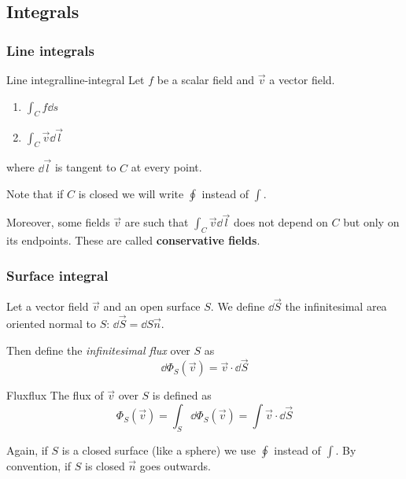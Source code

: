 \documentclass[12pt]{extarticle}
\begin{document}
\subsection{Integrals}

\subsubsection{Line integrals}

\begin{definition}{Line integral}{line-integral}
	Let $f$ be a scalar field and $\vec v$ a vector field.
	\begin{enumerate}
		\item $\int_C f \dd{s}$
		\item $\int_C \vec v \dd{\vec l}$
	\end{enumerate}
	where $\dd{\vec l}$ is tangent to $C$ at every point.
\end{definition}

Note that if $C$ is closed we will write $\oint$ instead of $\int$.

Moreover, some fields $\vec v$ are such that $\int_C \vec v \dd{\vec l}$ does not depend on $C$ but only on its endpoints.
These are called \textbf{conservative fields}.

\subsubsection{Surface integral}

Let a vector field $\vec v$ and an open surface $S$.
We define $\dd{\vec S}$ the infinitesimal area oriented normal to $S$: $\dd{\vec S} = \dd{S} \vec n$.

Then define the \textit{infinitesimal flux} over $S$ as
\begin{equation}
	\dd{\Phi_S(\vec v)} = \vec v \cdot \dd{\vec S}
\end{equation}

\begin{definition}{Flux}{flux}
	The flux of $\vec v$ over $S$ is defined as
	\begin{equation}
		\Phi_S(\vec v) = \int_S \dd{\Phi_S(\vec v)} = \int \vec v \cdot \dd{\vec S}
	\end{equation}
\end{definition}

Again, if $S$ is a closed surface (like a sphere) we use $\oint$ instead of $\int$.
By convention, if $S$ is closed $\vec n$ goes outwards.
\end{document}

